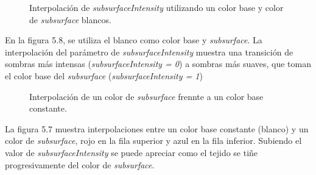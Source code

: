 \begin{figure}[H]
  \vspace{0.5cm}
  \centering
    \caption{Interpolaci\'on de \textit{subsurfaceIntensity} utilizando un color base y color de \textit{subsurface} blancos.}
\end{figure}
\singlespacing

En la figura 5.8, se utiliza el blanco como color base y \textit{subsurface}. La interpolaci\'on del par\'ametro de \textit{subsurfaceIntensity}
muestra una transici\'on de sombras m\'as intensas (\textit{subsurfaceIntensity = 0}) a sombras m\'as suaves, que toman el color base del
\textit{subsurface} (\textit{subsurfaceIntensity = 1})\\



\begin{figure}[H]
  \vspace{0.5cm}
  \centering
    \caption{Interpolaci\'on de un color de \textit{subsurface} frennte a un color base constante.}
 \end{figure}
\singlespacing

La figura 5.7 muestra interpolaciones entre un color base constante (blanco) y un color de \textit{subsurface},
rojo en la fila superior y azul en la fila inferior. Subiendo el valor de \textit{subsurfaceIntensity}
se puede apreciar como el tejido se ti\~ne progresivamente del color de \textit{subsurface}.



